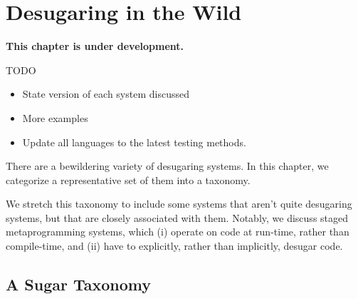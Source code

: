 \chapter{Desugaring in the Wild}\label{chap:taxonomy}

\textbf{This chapter is under development.}

TODO
\begin{itemize}
\item State version of each system discussed
\item More examples
\item Update all languages to the latest testing methods.
\end{itemize}

There are a bewildering variety of desugaring systems.  In this
chapter, we categorize a representative set of them into a taxonomy.

We stretch this taxonomy to include some systems that aren't quite
desugaring systems, but that are closely associated with
them. Notably, we discuss staged metaprogramming systems, which (i)
operate on code at run-time, rather than compile-time, and (ii) have
to explicitly, rather than implicitly, desugar code.

\section{A Sugar Taxonomy}

